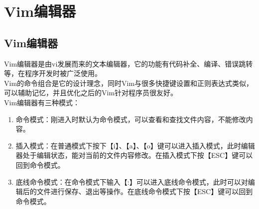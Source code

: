 \documentclass[12pt, openany, oneside]{book}
\begin{document}
\begin{table}[H]
	\centering
	\caption{nano编辑器命令}
\end{table}

\newpage

\section{Vim编辑器}

\subsection{Vim编辑器}

Vim编辑器是由vi发展而来的文本编辑器，它的功能有代码补全、编译、错误跳转等，在程序开发时被广泛使用。 \\

Vim的命令组合是它的设计理念，同时Vim与很多快捷键设置和正则表达式类似，可以辅助记忆，并且优化之后的Vim针对程序员很友好。 \\

Vim编辑器有三种模式：

\begin{enumerate}
	\item 命令模式：刚进入时默认为命令模式，可以查看和查找文件内容，不能修改内容。

	\item 插入模式：在普通模式下按下【i】、【a】、【o】键可以进入插入模式，此时编辑器处于编辑状态，能对当前的文件内容修改。在插入模式下按【ESC】键可以回到命令模式。

	\item 底线命令模式：在命令模式下输入【:】可以进入底线命令模式，此时可以对编辑后的文件进行保存、退出等操作。在底线命令模式下按【ESC】键可以回到命令模式。
\end{enumerate}
\end{document}
